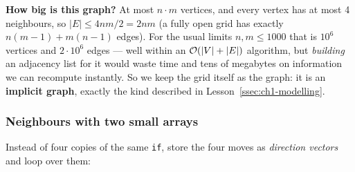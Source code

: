 \textbf{How big is this graph?} At most $n\cdot m$ vertices, and every vertex has at most 4 neighbours, so $|E| \le 4nm/2 = 2nm$ (a fully open grid has exactly $n(m-1) + m(n-1)$ edges). For the usual limits $n, m \le 1000$ that is $10^6$ vertices and $2\cdot10^6$ edges --- well within an $\mathcal{O}(|V|+|E|)$ algorithm, but \emph{building} an adjacency list for it would waste time and tens of megabytes on information we can recompute instantly. So we keep the grid itself as the graph: it is an \textbf{implicit graph}, exactly the kind described in Lesson~\ref{ssec:ch1-modelling}.

\subsubsection*{Neighbours with two small arrays}

Instead of four copies of the same \texttt{if}, store the four moves as \emph{direction vectors} and loop over them:

